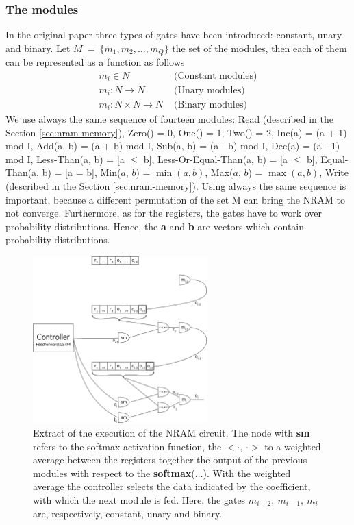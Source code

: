 \subsubsection*{The modules}
In the original paper three types of gates have been introduced: constant, unary and binary. Let $M\ =\ \{m_1, m_2, \dots, m_Q \}$ the set of the modules, then each of them can be represented as a function as follows
\begin{align}
		m_i \in N & \textrm{ (Constant modules)} \\
		m_i: N \rightarrow N & \textrm{ (Unary modules)} \\
		m_i: N \times N \rightarrow N & \textrm{ (Binary modules)}
\end{align}
We use always the same sequence of fourteen modules: Read (described in the Section \ref{sec:nram-memory}), Zero() = 0, One() = 1, Two() = 2, Inc(a) = (a + 1) mod I, Add(a, b) = (a + b) mod I, Sub(a, b) = (a - b) mod I, Dec(a) = (a - 1) mod I, Less-Than(a, b) = [a $\le$ b], Less-Or-Equal-Than(a, b) = [a $\leq$ b], Equal-Than(a, b) = [a = b], Min($a$, $b$) = $\min(a, b)$, Max($a$, $b$) = $\max(a, b)$, Write (described in the Section \ref{sec:nram-memory}). Using always the same sequence is important, because a different permutation of the set M can bring the NRAM to not converge. Furthermore, as for the registers, the gates have to work over probability distributions. Hence, the \textbf{a} and \textbf{b} are vectors which contain probability distributions.

\begin{figure}[t]
	\centering
	\includegraphics[width=0.6\textwidth]{figures/register-only-model.png}
	\caption{Extract of the execution of the NRAM circuit. The node with \textbf{sm} refers to the softmax activation function, the $<\cdot$, $\cdot>$ to a weighted average between the registers together the output of the previous modules with respect to the \textbf{softmax}($\dots$). With the weighted average the controller selects the data indicated by the coefficient, with which the next module is fed. Here, the gates $m_{i-2},\ m_{i-1},\ m_{i}$ are, respectively, constant, unary and binary.}
	\label{fig:register-only-model}
\end{figure}

